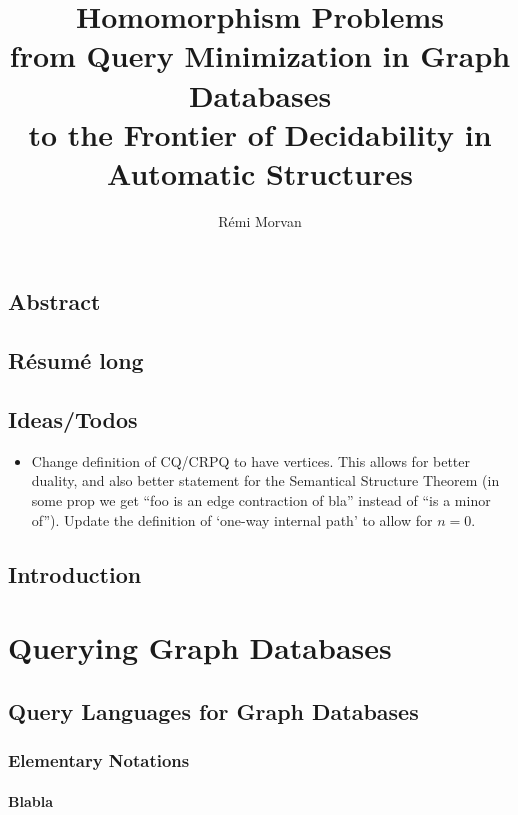 \documentclass[a4paper,sfsidenotes,twoside,justified,nobib]{tufte-book-custom}
\title[Homomorphism Problems]{Homomorphism Problems\\from Query Minimization in Graph Databases\\ to the Frontier of Decidability in Automatic Structures}
\author{Rémi Morvan}
\begin{document}
\frontmatter




\mainmatter
\chapter*{Abstract}

\chapter*{Résumé long}

\chapter*{Ideas/Todos}

\begin{itemize}
	\item Change definition of CQ/CRPQ to have vertices. This allows for better duality,
		and also better statement for the Semantical Structure Theorem (in some prop we get
		``foo is an edge contraction of bla'' instead of ``is a minor of'').
		Update the definition of `one-way internal path' to allow for $n=0$.
\end{itemize}

\chapter{Introduction}

\part{Querying Graph Databases}

\chapter{Query Languages for Graph Databases}

\section{Elementary Notations}

\subsection{Blabla}
\end{document}
